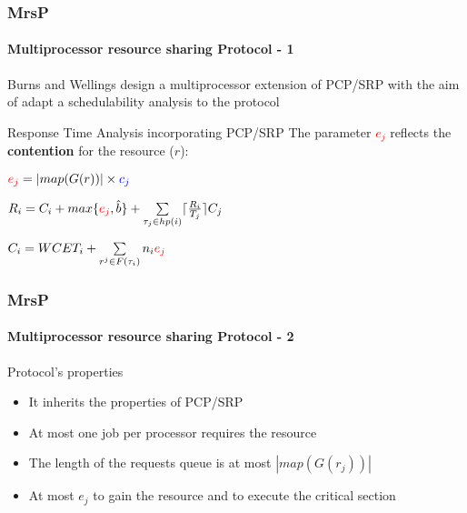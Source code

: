 \begin{frame}
	\frametitle{MrsP}
	\framesubtitle{Multiprocessor resource sharing Protocol - 1}


	Burns and Wellings design a multiprocessor extension of PCP/SRP with the aim of adapt a schedulability analysis to the protocol


	\vspace{0.2cm}

	\begin{block}{Response Time Analysis incorporating PCP/SRP}
		The parameter \textcolor{red}{$e_j$} reflects the \textbf{contention} for the resource ($r$):

		\vspace{0.2cm}
		\centerline{$\textcolor{red}{e_j} = | map(G(r)) | \times \textcolor{blue}{c_j}$}
		\vspace{0.2cm}
		\centerline{$R_i = C_i + max \text{\{\textcolor{red}{$e_j$}},\hat{b}\} + \sum\limits_{\tau_j \in hp(i)} \lceil\frac{R_i}{T_j}\rceil C_j$}
		\vspace{0.2cm}
		\centerline{$C_i = WCET_i + \sum\limits_{r^j \in F(\tau_i)} n_i \text{\textcolor{red}{$e_j$}}$}

	\end{block}

\end{frame}

\begin{frame}
	\frametitle{MrsP}
	\framesubtitle{Multiprocessor resource sharing Protocol - 2}

	\centerline{}

	\begingroup
 	  \fontsize{9pt}{8pt}\selectfont
	\begin{block}{Protocol's properties}
		\begin{itemize}
			\item It inherits the properties of PCP/SRP
			\item At most one job per processor requires the resource
			\item The length of the requests queue is at most $| map(G(r_j)) |$
			\item At most $e_j$ to gain the resource and to execute the critical section
		\end{itemize}
	\end{block}
	\endgroup



\end{frame}

